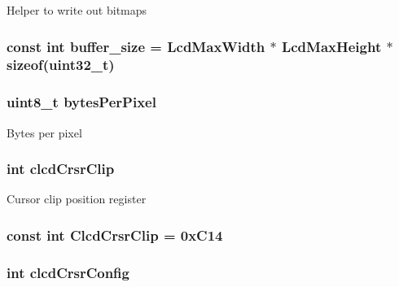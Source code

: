 Helper to write out bitmaps \hypertarget{classPl111_a9bd822a4ae927624f7827c898422d1db}{
\subsubsection[{buffer\_\-size}]{\setlength{\rightskip}{0pt plus 5cm}const int {\bf buffer\_\-size} = {\bf LcdMaxWidth} $\ast$ {\bf LcdMaxHeight} $\ast$ sizeof({\bf uint32\_\-t})}}
\label{classPl111_a9bd822a4ae927624f7827c898422d1db}
\hypertarget{classPl111_a2c6362e11e7da8346152a55d2c1578a6}{
\subsubsection[{bytesPerPixel}]{\setlength{\rightskip}{0pt plus 5cm}uint8\_\-t {\bf bytesPerPixel}}}
\label{classPl111_a2c6362e11e7da8346152a55d2c1578a6}
Bytes per pixel \hypertarget{classPl111_a502477050a99c8f88ead81a5c0c0b5de}{
\subsubsection[{clcdCrsrClip}]{\setlength{\rightskip}{0pt plus 5cm}int {\bf clcdCrsrClip}}}
\label{classPl111_a502477050a99c8f88ead81a5c0c0b5de}
Cursor clip position register \hypertarget{classPl111_ad3ec0e054ab4011d614f776623c6a497}{
\subsubsection[{ClcdCrsrClip}]{\setlength{\rightskip}{0pt plus 5cm}const int {\bf ClcdCrsrClip} = 0xC14}}
\label{classPl111_ad3ec0e054ab4011d614f776623c6a497}
\hypertarget{classPl111_a60838816fc4cc7e898042259f9eec917}{
\subsubsection[{clcdCrsrConfig}]{\setlength{\rightskip}{0pt plus 5cm}int {\bf clcdCrsrConfig}}}
